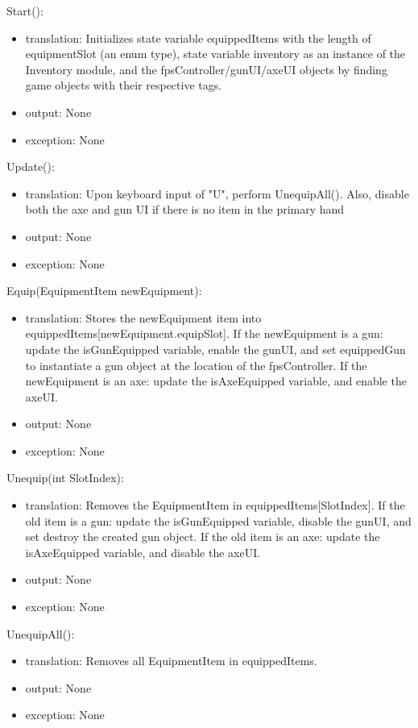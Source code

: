 \documentclass[12pt]{article}
\begin{document}
\noindent Start():
\begin{itemize}
\item translation: Initializes state variable equippedItems with the length of equipmentSlot (an enum type), state variable inventory as an instance of the Inventory module, {\color{magenta} and the fpsController/gunUI/axeUI objects by finding game objects with their respective tags.}
\item output: None
\item exception: None
\end{itemize}

\noindent Update():
\begin{itemize}
\item translation: Upon keyboard input of "U", perform UnequipAll(). {\color{magenta} Also, disable both the axe and gun UI if there is no item in the primary hand}
\item output: None
\item exception: None
\end{itemize}

\noindent Equip(EquipmentItem newEquipment):
\begin{itemize}
\item translation: Stores the newEquipment item into equippedItems[newEquipment.equipSlot]. {\color{magenta} If the newEquipment is a gun: update the isGunEquipped variable, enable the gunUI, and set equippedGun to instantiate a gun object at the location of the fpsController. If the newEquipment is an axe: update the isAxeEquipped variable, and enable the axeUI.}
\item output: None
\item exception: None
\end{itemize}

\noindent Unequip(int SlotIndex):
\begin{itemize}
\item translation: Removes the EquipmentItem in equippedItems[SlotIndex].  {\color{magenta} If the old item is a gun: update the isGunEquipped variable, disable the gunUI, and set destroy the created gun object. If the old item is an axe: update the isAxeEquipped variable, and disable the axeUI.}
\item output: None
\item exception: None
\end{itemize}

\noindent UnequipAll():
\begin{itemize}
\item translation: Removes all EquipmentItem in equippedItems.
\item output: None
\item exception: None
\end{itemize}
\end{document}
